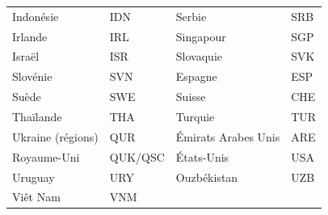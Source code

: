 \documentclass[
  french,
  11pt,
  a4paper,
  oneside]{report}
\begin{document}
{\begin{longtable}[]{@{}llll@{}}
Indonésie & IDN & Serbie & SRB \\
Irlande & IRL & Singapour & SGP \\
Israël & ISR & Slovaquie & SVK \\
Slovénie & SVN & Espagne & ESP \\
Suède & SWE & Suisse & CHE \\
Thaïlande & THA & Turquie & TUR \\
Ukraine (régions) & QUR & Émirats Arabes Unis & ARE \\
Royaume-Uni & QUK/QSC & États-Unis & USA \\
Uruguay & URY & Ouzbékistan & UZB \\
Viêt Nam & VNM & & \\
\end{longtable}
}
\end{document}
